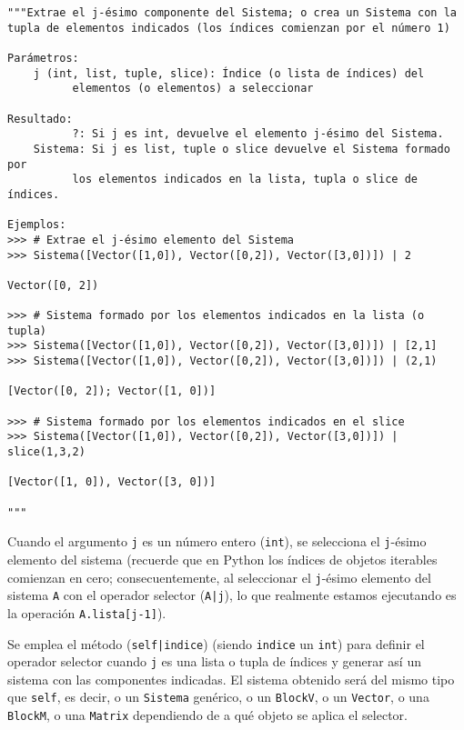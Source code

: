 \documentclass[11pt]{report}
\begin{document}
\begin{verbatim}
"""Extrae el j-ésimo componente del Sistema; o crea un Sistema con la
tupla de elementos indicados (los índices comienzan por el número 1)

Parámetros:
    j (int, list, tuple, slice): Índice (o lista de índices) del 
          elementos (o elementos) a seleccionar

Resultado:
          ?: Si j es int, devuelve el elemento j-ésimo del Sistema.
    Sistema: Si j es list, tuple o slice devuelve el Sistema formado por
          los elementos indicados en la lista, tupla o slice de índices.

Ejemplos:
>>> # Extrae el j-ésimo elemento del Sistema 
>>> Sistema([Vector([1,0]), Vector([0,2]), Vector([3,0])]) | 2

Vector([0, 2])

>>> # Sistema formado por los elementos indicados en la lista (o tupla)
>>> Sistema([Vector([1,0]), Vector([0,2]), Vector([3,0])]) | [2,1]
>>> Sistema([Vector([1,0]), Vector([0,2]), Vector([3,0])]) | (2,1)

[Vector([0, 2]); Vector([1, 0])]

>>> # Sistema formado por los elementos indicados en el slice
>>> Sistema([Vector([1,0]), Vector([0,2]), Vector([3,0])]) | slice(1,3,2)

[Vector([1, 0]), Vector([3, 0])]

"""
\end{verbatim}

Cuando el argumento \texttt{j} es un número entero (\texttt{int}), se selecciona el
\texttt{j}-ésimo elemento del sistema (recuerde que en Python los índices de
objetos iterables comienzan en cero; consecuentemente, al seleccionar
el \texttt{j}-ésimo elemento del sistema \texttt{A} con el operador selector
(\texttt{A|j}), lo que realmente estamos ejecutando es la operación
\texttt{A.lista[j-1]}).

Se emplea el método (\texttt{self|indice}) (siendo \texttt{indice} un \texttt{int}) para
definir el operador selector cuando \texttt{j} es una lista o tupla de
índices y generar así un sistema con las componentes indicadas. El
sistema obtenido será del mismo tipo que \texttt{self}, es decir, o un
\texttt{Sistema} genérico, o un \texttt{BlockV}, o un \texttt{Vector}, o una \texttt{BlockM}, o
una \texttt{Matrix} dependiendo de a qué objeto se aplica el selector.
\end{document}
